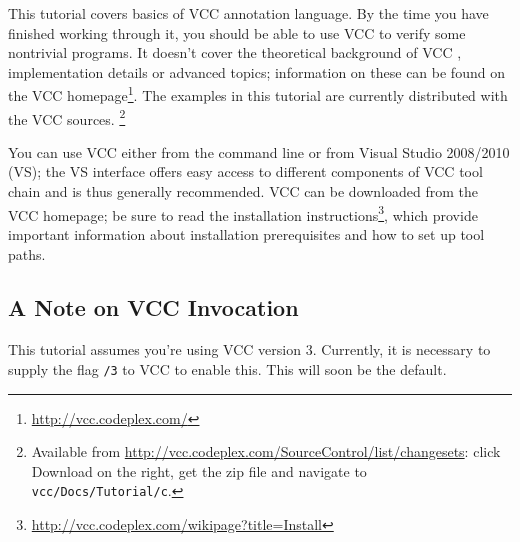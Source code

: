 This tutorial covers basics of VCC annotation language. By the time
you have finished working through it, you should be able to use VCC to
verify some nontrivial programs. It doesn't cover the theoretical
background of VCC \cite{lci}, implementation details \cite{vcc}
or advanced topics;
information on these can be found on the VCC
homepage\footnote{\url{http://vcc.codeplex.com/}}.
The examples in this tutorial are currently distributed with the VCC sources.%
\footnote{
Available from \url{http://vcc.codeplex.com/SourceControl/list/changesets}: click Download on the right,
get the zip file and navigate to \lstinline|vcc/Docs/Tutorial/c|.}

You can use VCC either from the command line or from Visual Studio
2008/2010 (VS); the VS interface offers easy access to different components of
VCC tool chain and is thus generally recommended.
VCC can be downloaded from the VCC homepage; 
be sure to read the installation instructions\footnote{\url{http://vcc.codeplex.com/wikipage?title=Install}},
which provide important information about installation prerequisites 
and how to set up tool paths.

\subsection{A Note on VCC Invocation}
\label{sect:todo-invoke}
This tutorial assumes you're using VCC version 3. 
Currently, it is necessary to supply the flag \texttt{/3}
to VCC to enable this.
This will soon be the default.

